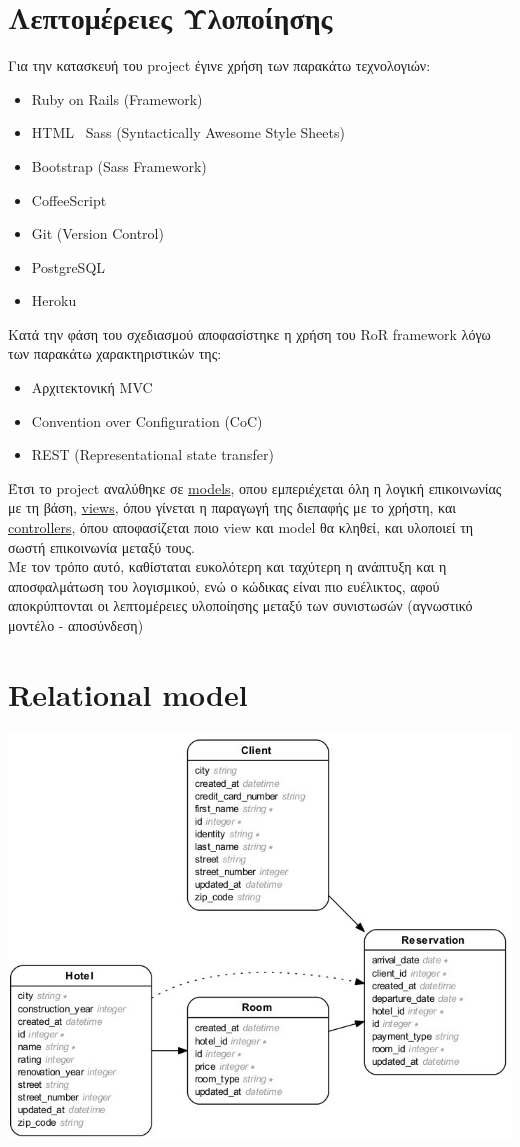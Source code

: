 \documentclass[a4paper,12pt]{article}
\begin{document}
\section{Λεπτομέρειες Υλοποίησης}
Για την κατασκευή του project έγινε χρήση των παρακάτω τεχνολογιών:
\begin{itemize}
  \item Ruby on Rails (Framework)
  \item HTML \ Sass (Syntactically Awesome Style Sheets) 
  \item Bootstrap (Sass Framework)
  \item CoffeeScript
  \item Git (Version Control)
  \item PostgreSQL
  \item Heroku
\end{itemize}

Κατά την φάση του σχεδιασμού αποφασίστηκε η χρήση του RoR framework λόγω των παρακάτω χαρακτηριστικών της:
\begin{itemize}
  \item Αρχιτεκτονική MVC
  \item Convention over Configuration (CoC)
  \item REST (Representational state transfer)
\end{itemize}

Έτσι το project αναλύθηκε σε \underline{models}, οπου εμπεριέχεται όλη η λογική
επικοινωνίας με τη βάση, \underline{views}, όπου γίνεται η παραγωγή της διεπαφής
με το χρήστη, και \underline{controllers}, όπου αποφασίζεται ποιο view και model
θα κληθεί, και υλοποιεί τη σωστή επικοινωνία μεταξύ τους.\\

Με τον τρόπο αυτό, καθίσταται ευκολότερη και ταχύτερη η ανάπτυξη και η
αποσφαλμάτωση του λογισμικού, ενώ ο κώδικας είναι πιο ευέλικτος, αφού
αποκρύπτονται οι λεπτομέρειες υλοποίησης μεταξύ των συνιστωσών (αγνωστικό
μοντέλο - αποσύνδεση)

\section{Relational model}
\includegraphics[scale=0.7]{ER} 
\end{document}
